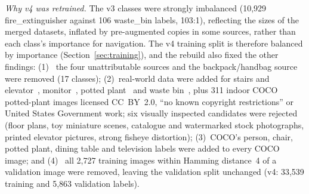 \documentclass[3p,times,procedia]{elsarticle}
\DeclareRobustCommand{\rev}[1]{{\hlattr=1 #1}}
\DeclareRobustCommand{\rev}[1]{\hl{#1}}
\DeclareRobustCommand{\rev}[1]{#1}
\begin{document}
\emph{Why v4 was retrained.} \rev{The v3 classes were strongly imbalanced
(10,929 fire\_extinguisher against 106 waste\_bin labels, 103:1)}, reflecting
the sizes of the merged datasets, inflated by pre-augmented copies in some
sources, rather than each class's importance for navigation. The v4 training split is therefore balanced by importance
(Section~\ref{sec:training}), and the rebuild also fixed the other findings:
(1)~\rev{the four unattributable sources and the backpack/handbag source were
removed (17 classes)}; (2)~real-world data were added for stairs and
elevator~\cite{rf_navigation,rf_elevatordoor}, monitor~\cite{rf_monitor},
potted plant~\cite{rf_plant} and waste bin~\cite{rf_dustbin,rf_trashbin},
plus 311 indoor COCO potted-plant images licensed CC~BY~2.0, ``no known
copyright restrictions'' or United States Government work; six visually
inspected candidates were rejected (floor plans, toy miniature scenes,
catalogue and watermarked stock photographs, printed elevator pictures,
strong fisheye distortion); (3)~COCO's person, chair, potted plant, dining
table and television labels were added to every COCO image; and (4)~\rev{all
2,727 training images within Hamming distance~4 of a validation image were
removed, leaving the validation split unchanged} \rev{(v4: 33,539 training and
5,863 validation labels)}.
\end{document}
